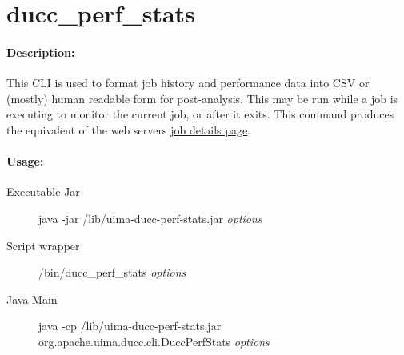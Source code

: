 \ifpdf
\else
{}
\fi
    \section{ducc\_perf\_stats}
    \label{sec:cli.ducc-perf-stats}
    \paragraph{Description:}
    This CLI is used to format job history and performance data into CSV or (mostly) human readable
    form for post-analysis.  This may be run while a job is executing to monitor the current job, or
    after it exits.  This command produces the equivalent of the web servers
    \hyperref[sec:ws-job-details]{job details page}.

    \paragraph{Usage:}
    \begin{description}
    \item[Executable Jar] java -jar \ducchome/lib/uima-ducc-perf-stats.jar {\em options}
    \item[Script wrapper] \ducchome/bin/ducc\_perf\_stats {\em options}
    \item[Java Main]      java -cp \ducchome/lib/uima-ducc-perf-stats.jar org.apache.uima.ducc.cli.DuccPerfStats {\em options}
    \end{description}

